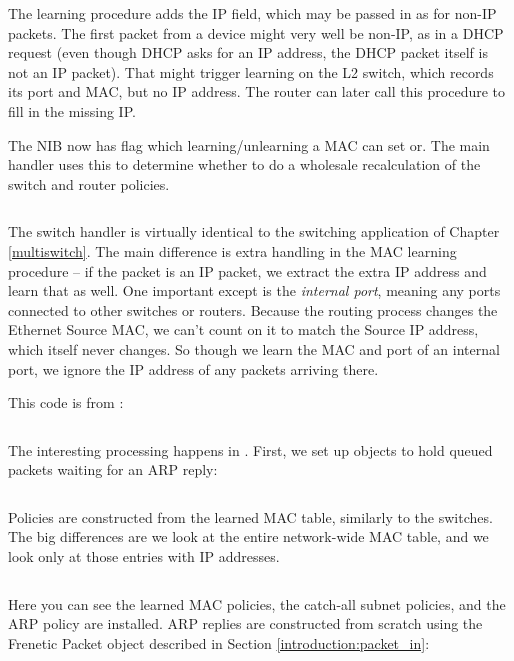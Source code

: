 \inputminted[firstline=56,lastline=87]{python}{code/routing/network_information_base.py} 

The learning procedure adds the IP field, which may be passed in as 
for non-IP packets.  The first packet from a device might very well be non-IP, as in a DHCP 
request (even though DHCP asks for an IP address, the DHCP packet itself is not an IP packet).
That might trigger learning on the L2 switch, which records its port and MAC, but no IP address.  
The router can later call this procedure to fill in the missing IP.  

The NIB now has  flag
which learning/unlearning a MAC can set or.  The main handler uses this to determine whether to do 
a wholesale recalculation of the switch and router policies.

\inputminted[firstline=186]{python}{code/routing/network_information_base.py} 

The switch handler is virtually identical to the switching application of Chapter \ref{multiswitch}.  
The main difference is extra handling in the MAC learning procedure -- if the packet is an
IP packet, we extract the extra IP address and learn that as well.  One important except is the 
\emph{internal port}, meaning any ports connected to other switches or routers.  Because the 
routing process changes the Ethernet Source MAC, we can't count on it to match the Source IP address,
which itself never changes.  So though we learn the MAC and port of an internal port, we ignore the
IP address of any packets arriving there.  

This code is from :

\inputminted[firstline=33]{python}{code/routing/switch_handler.py}

The interesting processing happens in . First, we set up 
objects to hold queued packets waiting for an ARP reply:

\inputminted[firstline=8,lastline=12]{python}{code/routing/router_handler.py} 

Policies are constructed from the learned MAC table, similarly to the switches.  The big differences
are we look at the entire network-wide MAC table, and we look only at those entries with IP 
addresses.

\inputminted[firstline=24,lastline=53]{python}{code/routing/router_handler.py} 

Here you can see the learned MAC policies, the catch-all subnet policies, and the ARP policy are 
installed.  ARP replies are constructed from scratch using the Frenetic Packet object described in
Section \ref{introduction:packet_in}:

